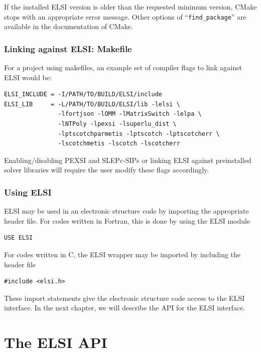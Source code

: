 \documentclass{report}
\begin{document}
If the installed ELSI version is older than the requested minimum version, CMake stops with an appropriate error message.  Other options of ``\verb+find_package+'' are available in the documentation of CMake.

\subsection{Linking against ELSI:  Makefile}
\label{subsec:import_makefile}
For a project using makefiles, an example set of compiler flags to link against ELSI would be:
\begin{tcolorbox}
\begin{verbatim}
ELSI_INCLUDE = -I/PATH/TO/BUILD/ELSI/include
ELSI_LIB     = -L/PATH/TO/BUILD/ELSI/lib -lelsi \
               -lfortjson -lOMM -lMatrixSwitch -lelpa \
               -lNTPoly -lpexsi -lsuperlu_dist \
               -lptscotchparmetis -lptscotch -lptscotcherr \
               -lscotchmetis -lscotch -lscotcherr
\end{verbatim}
\end{tcolorbox}

Enabling/disabling PEXSI and SLEPc-SIPs or linking ELSI against preinstalled solver libraries will require the user modify these flags accordingly.

\subsection{Using ELSI}
\label{subsec:import_use}
ELSI may be used in an electronic structure code by importing the appropriate header file.  For codes written in Fortran, this is done by using the ELSI module
\begin{tcolorbox}
\begin{verbatim}
USE ELSI
\end{verbatim}
\end{tcolorbox}

For codes written in C, the ELSI wrapper may be imported by including the header file
\begin{tcolorbox}
\begin{verbatim}
#include <elsi.h>
\end{verbatim}
\end{tcolorbox}

These import statements give the electronic structure code access to the ELSI interface.  In the next chapter, we will describe the API for the ELSI interface.

\chapter{The ELSI API}
\end{document}
